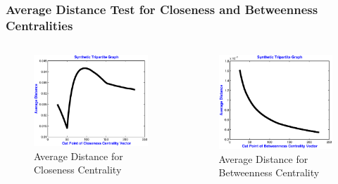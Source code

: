 \documentclass{beamer}
\begin{document}
\begin{frame}
\frametitle{Average Distance Test for Closeness and Betweenness Centralities}
\begin{columns}[T]
\begin{column}{.5\textwidth}
\begin{figure}[h]
\begin{center}
\includegraphics[width=0.80\columnwidth]{avgdist_close}
\end{center}
\caption{Average Distance for Closeness Centrality}
\label{fig:Average distance for closeness centrality vector}
\end{figure}
\end{column}
\begin{column}{.5\textwidth}
\begin{figure}[h]
\begin{center}
\includegraphics[width=0.80\columnwidth]{avgdist_betw}
\end{center}
\caption{Average Distance for Betweenness Centrality}
\label{fig:Average distance for betweenness centrality vector}
\end{figure}
\end{column}
\end{columns}
\end{frame}
\end{document}
